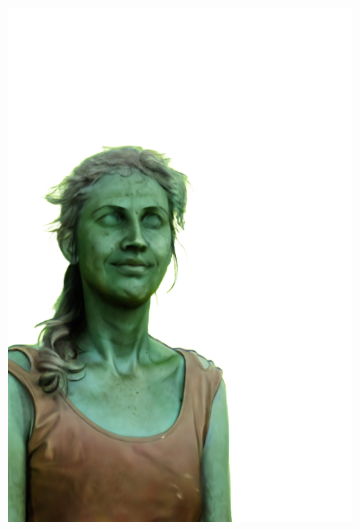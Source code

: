 \begin{figure}[ht]
\begin{subfigure}{0.08\linewidth}
        \includegraphics[width=\textwidth]{Figures/results/low/dora_stone/11_render.png}

\end{subfigure}
\end{figure}
